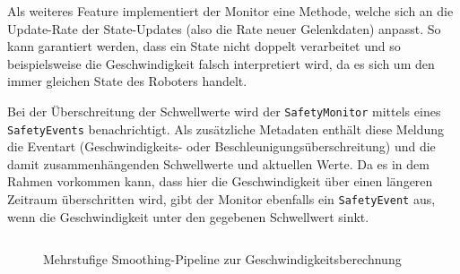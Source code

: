 Als weiteres Feature implementiert der Monitor eine Methode, welche sich an die
Update-Rate der State-Updates (also die Rate neuer Gelenkdaten) anpasst. So kann
garantiert werden, dass ein State nicht doppelt verarbeitet und so
beispielsweise die Geschwindigkeit falsch interpretiert wird, da es sich um den
immer gleichen State des Roboters handelt.

Bei der Überschreitung der Schwellwerte wird der \texttt{SafetyMonitor}
mittels eines \texttt{SafetyEvents} benachrichtigt. Als zusätzliche
Metadaten enthält
diese Meldung die Eventart (Geschwindigkeits- oder
Beschleunigungsüberschreitung) und die damit zusammenhängenden Schwellwerte und
aktuellen Werte. Da es in dem Rahmen vorkommen kann, dass hier die
Geschwindigkeit über einen längeren Zeitraum überschritten wird, gibt der
Monitor ebenfalls ein \texttt{SafetyEvent} aus, wenn die
Geschwindigkeit unter den
gegebenen Schwellwert sinkt.

\begin{figure}[H]
  \inputminted[fontsize=\footnotesize]{csharp}{code-snippets/SmoothVelocities.cs}
  \caption{Mehrstufige Smoothing-Pipeline zur Geschwindigkeitsberechnung}
  \label{listing:smoothing_pipeline}
\end{figure}
\newpage
